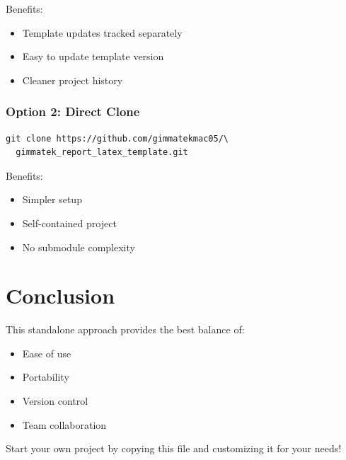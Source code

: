 \documentclass[12pt,a4paper]{gimmatek-report-template}
\begin{document}
Benefits:
\begin{itemize}
\item Template updates tracked separately
\item Easy to update template version
\item Cleaner project history
\end{itemize}

\subsection{Option 2: Direct Clone}

\begin{verbatim}
git clone https://github.com/gimmatekmac05/\
  gimmatek_report_latex_template.git
\end{verbatim}

Benefits:
\begin{itemize}
\item Simpler setup
\item Self-contained project
\item No submodule complexity
\end{itemize}

\chapter{Conclusion}

This standalone approach provides the best balance of:
\begin{itemize}
\item Ease of use
\item Portability
\item Version control
\item Team collaboration
\end{itemize}

Start your own project by copying this file and customizing it for your needs!
\end{document}
